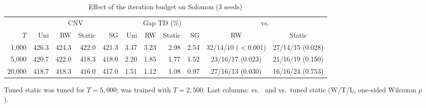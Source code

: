\begin{table}[t]
\centering
\caption{Effect of the iteration budget on Solomon (3 seeds)}\label{tab:budget}
\setlength{\tabcolsep}{2.4pt}
\begin{adjustbox}{max width=\linewidth}
\begin{tabular}{rrrrrrrrrcc}
\toprule
 & \multicolumn{4}{c}{CNV} & \multicolumn{4}{c}{Gap TD (\%)} & \multicolumn{2}{c}{\sgalns{} vs.} \\ \cmidrule(lr){2-5}\cmidrule(lr){6-9}\cmidrule(lr){10-11}
$T$ & Uni & RW & Static & SG & Uni & RW & Static & SG & RW & Static\\ \midrule
1,000 & 426.3 & 424.3 & 422.0 & 421.3 & 3.47 & 3.23 & 2.98 & 2.54 & 32/14/10 ($<$0.001) & 27/14/15 (0.028)\\
5,000 & 420.7 & 422.0 & 418.3 & 418.0 & 2.20 & 1.85 & 1.77 & 1.52 & 23/16/17 (0.023) & 21/16/19 (0.150)\\
20,000 & 418.7 & 418.3 & 416.0 & 417.0 & 1.51 & 1.12 & 1.08 & 0.97 & 27/16/13 (0.030) & 16/16/24 (0.753)\\
\bottomrule
\end{tabular}
\end{adjustbox}
\par\vspace{2pt}\parbox{\linewidth}{\footnotesize Tuned static was tuned for $T=5{,}000$; \sgalns{} was trained with $T=2{,}500$. Last columns: \sgalns{} vs.\ \Rw{} and vs.\ tuned static (W/T/L, one-sided Wilcoxon $p$).}
\end{table}
